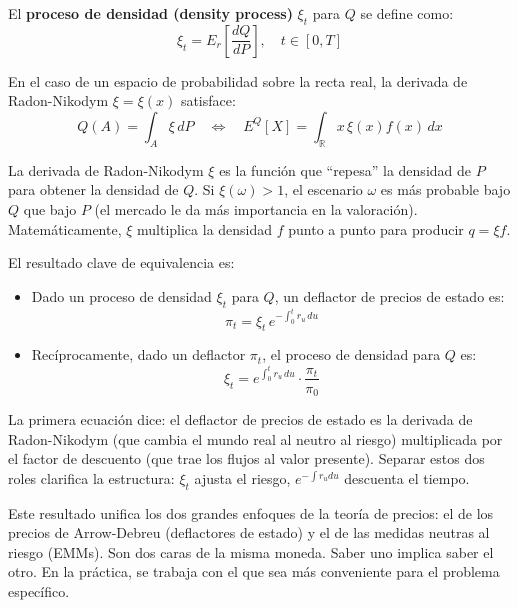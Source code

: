 \documentclass[12pt]{article}
\begin{document}
El \textbf{proceso de densidad (density process)} $\xi_t$ para $Q$ se define como:
\begin{equation}
  \xi_t = E_r\!\left[\frac{dQ}{dP}\right], \quad t \in [0,T]
\end{equation}

En el caso de un espacio de probabilidad sobre la recta real, la derivada de Radon-Nikodym $\xi = \xi(x)$ satisface:
\begin{equation}
  Q(A) = \int_A \xi \, dP \quad \Leftrightarrow \quad E^Q[X] = \int_{\mathbb{R}} x\,\xi(x)f(x)\,dx
\end{equation}

\begin{intuicionmat}
La derivada de Radon-Nikodym $\xi$ es la funci\'on que ``repesa'' la densidad de $P$ para obtener la densidad de $Q$. Si $\xi(\omega) > 1$, el escenario $\omega$ es m\'as probable bajo $Q$ que bajo $P$ (el mercado le da m\'as importancia en la valoraci\'on). Matem\'aticamente, $\xi$ multiplica la densidad $f$ punto a punto para producir $q = \xi f$.
\end{intuicionmat}

El resultado clave de equivalencia es:

\begin{itemize}
  \item Dado un proceso de densidad $\xi_t$ para $Q$, un deflactor de precios de estado es:
  \begin{equation}
    \pi_t = \xi_t \, e^{-\int_0^t r_u \, du}
  \end{equation}
  \item Rec\'iprocamente, dado un deflactor $\pi_t$, el proceso de densidad para $Q$ es:
  \begin{equation}
    \xi_t = e^{\int_0^t r_u \, du} \cdot \frac{\pi_t}{\pi_0}
  \end{equation}
\end{itemize}

\begin{intuicionmat}
La primera ecuaci\'on dice: el deflactor de precios de estado es la derivada de Radon-Nikodym (que cambia el mundo real al neutro al riesgo) multiplicada por el factor de descuento (que trae los flujos al valor presente). Separar estos dos roles clarifica la estructura: $\xi_t$ ajusta el riesgo, $e^{-\int r_u du}$ descuenta el tiempo.
\end{intuicionmat}

\begin{intuicion}
Este resultado unifica los dos grandes enfoques de la teor\'ia de precios: el de los precios de Arrow-Debreu (deflactores de estado) y el de las medidas neutras al riesgo (EMMs). Son dos caras de la misma moneda. Saber uno implica saber el otro. En la pr\'actica, se trabaja con el que sea m\'as conveniente para el problema espec\'ifico.
\end{intuicion}
\end{document}
